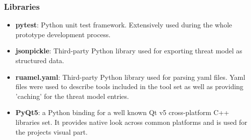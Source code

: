 \subsubsection{Libraries}\label{libraries}
\begin{itemize}
	\item \textbf{pytest}: Python unit test framework. Extensively used during the whole prototype development process.
	\item \textbf{jsonpickle}: Third-party Python library used for exporting threat model as structured data.
	\item \textbf{ruamel.yaml}: Third-party Python library used for parsing yaml files. Yaml files were used to describe tools included in the tool set as well as providing 'caching' for the threat model entries. 
	\item \textbf{PyQt5}: a Python binding for a well known Qt v5 cross-platform C++ libraries set. It provides native look across common platforms and is used for the projects visual part. 
\end{itemize}

